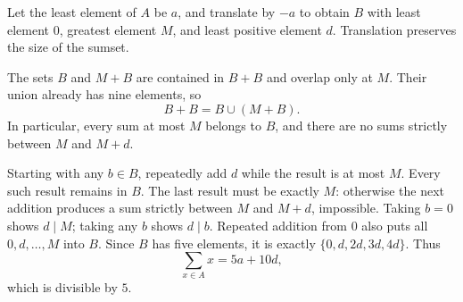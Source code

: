 Let the least element of $A$ be $a$, and translate by $-a$ to obtain $B$ with least element $0$, greatest element $M$, and least positive element $d$. Translation preserves the size of the sumset.

The sets $B$ and $M+B$ are contained in $B+B$ and overlap only at $M$. Their union already has nine elements, so
\[
B+B=B\cup(M+B).
\]
In particular, every sum at most $M$ belongs to $B$, and there are no sums strictly between $M$ and $M+d$.

Starting with any $b\in B$, repeatedly add $d$ while the result is at most $M$. Every such result remains in $B$. The last result must be exactly $M$: otherwise the next addition produces a sum strictly between $M$ and $M+d$, impossible. Taking $b=0$ shows $d\mid M$; taking any $b$ shows $d\mid b$. Repeated addition from $0$ also puts all $0,d,\ldots,M$ into $B$. Since $B$ has five elements, it is exactly $\{0,d,2d,3d,4d\}$. Thus
\[
\sum_{x\in A}x=5a+10d,
\]
which is divisible by $5$.
